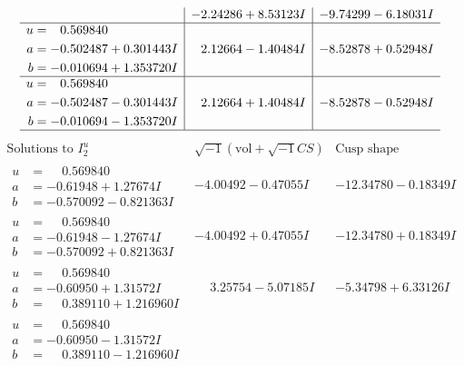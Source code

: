 \documentclass[1p]{elsarticle_modified}
\theoremstyle{definition}
\newcommand{\I}{\sqrt{-1}}
\begin{document}
$$\begin{array}{c|c|c}
 & -2.24286 + 8.53123 I & -9.74299 - 6.18031 I \\ \hline\begin{aligned}
u &= \phantom{-}0.569840\phantom{ +0.000000I} \\
a &= -0.502487 + 0.301443 I \\
b &= -0.010694 + 1.353720 I\end{aligned}
 & \phantom{-}2.12664 - 1.40484 I & -8.52878 + 0.52948 I \\ \hline\begin{aligned}
u &= \phantom{-}0.569840\phantom{ +0.000000I} \\
a &= -0.502487 - 0.301443 I \\
b &= -0.010694 - 1.353720 I\end{aligned}
 & \phantom{-}2.12664 + 1.40484 I & -8.52878 - 0.52948 I\\
 \hline 
 \end{array}$$\newpage$$\begin{array}{c|c|c}  
\text{Solutions to }I^u_{2}& \I (\text{vol} + \sqrt{-1}CS) & \text{Cusp shape}\\
 \hline 
\begin{aligned}
u &= \phantom{-}0.569840\phantom{ +0.000000I} \\
a &= -0.61948 + 1.27674 I \\
b &= -0.570092 - 0.821363 I\end{aligned}
 & -4.00492 - 0.47055 I & -12.34780 - 0.18349 I \\ \hline\begin{aligned}
u &= \phantom{-}0.569840\phantom{ +0.000000I} \\
a &= -0.61948 - 1.27674 I \\
b &= -0.570092 + 0.821363 I\end{aligned}
 & -4.00492 + 0.47055 I & -12.34780 + 0.18349 I \\ \hline\begin{aligned}
u &= \phantom{-}0.569840\phantom{ +0.000000I} \\
a &= -0.60950 + 1.31572 I \\
b &= \phantom{-}0.389110 + 1.216960 I\end{aligned}
 & \phantom{-}3.25754 - 5.07185 I & -5.34798 + 6.33126 I \\ \hline\begin{aligned}
u &= \phantom{-}0.569840\phantom{ +0.000000I} \\
a &= -0.60950 - 1.31572 I \\
b &= \phantom{-}0.389110 - 1.216960 I\end{aligned}

\end{array}$$
\end{document}
